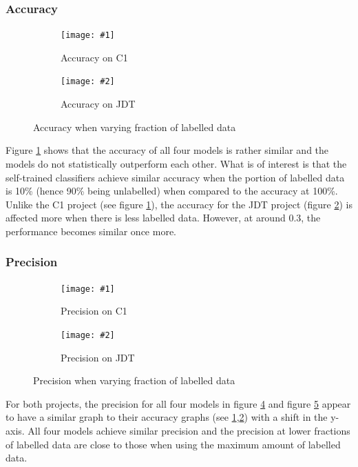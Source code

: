 \documentclass[../main.tex]{subfiles}
\begin{document}
\newcommand{\rqgraphs}[4]{
    \begin{figure}[H]
        \centering
        \begin{subfigure}[b]{0.75\textwidth}
            \texttt{[image: \#1]}
            \caption{#3 on C1}
            \label{fig:#4}
        \end{subfigure}
        
        \begin{subfigure}[b]{0.75\textwidth}
            \texttt{[image: \#2]}
            \caption{#3 on JDT}
            \label{fig:#4JDT}
        \end{subfigure}
    
        \caption{#3 when varying fraction of labelled data}
        \label{fig:#4Both}
    \end{figure}
}

\subsubsection{Accuracy}

\rqgraphs{images/Results/RQ1/Exp2/Myling/acc.png}{images/Results/RQ1/Exp2/JDT/acc.png}{Accuracy}{rq1exp2accuracy}

Figure \ref{fig:rq1exp2accuracy} shows that the accuracy of all four models is rather similar and the models do not statistically outperform each other. What is of interest is that the self-trained classifiers achieve similar accuracy when the portion of labelled data is 10\% (hence 90\% being unlabelled) when compared to the accuracy at 100\%. Unlike the C1 project (see figure \ref{fig:rq1exp2accuracy}), the accuracy for the JDT project (figure \ref{fig:rq1exp2accuracyJDT}) is affected more when there is less labelled data. However, at around 0.3, the performance becomes similar once more.

\subsubsection{Precision}

\rqgraphs{images/Results/RQ1/Exp2/Myling/prec.png}{images/Results/RQ1/Exp2/JDT/prec.png}{Precision}{rq1exp2precision}

For both projects, the precision for all four models in figure \ref{fig:rq1exp2precision} and figure \ref{fig:rq1exp2precisionJDT} appear to have a similar graph to their accuracy graphs (see \ref{fig:rq1exp2accuracy},\ref{fig:rq1exp2accuracyJDT}) with a shift in the y-axis. All four models achieve similar precision and the precision at lower fractions of labelled data are close to those when using the maximum amount of labelled data.
\end{document}
